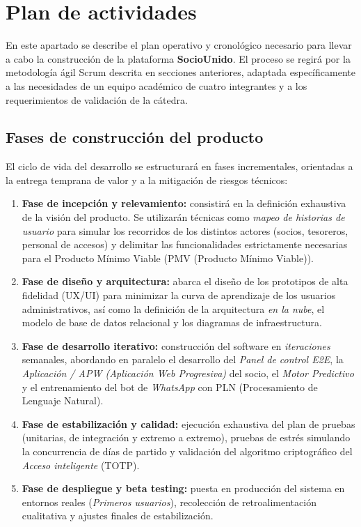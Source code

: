 \section{Plan de actividades}

En este apartado se describe el plan operativo y cronológico necesario para llevar a cabo la construcción de la plataforma \textbf{SocioUnido}. El proceso se regirá por la metodología ágil Scrum descrita en secciones anteriores, adaptada específicamente a las necesidades de un equipo académico de cuatro integrantes y a los requerimientos de validación de la cátedra.

\subsection{Fases de construcción del producto}

El ciclo de vida del desarrollo se estructurará en fases incrementales, orientadas a la entrega temprana de valor y a la mitigación de riesgos técnicos:

\begin{enumerate}
    \item \textbf{Fase de incepción y relevamiento:} consistirá en la definición exhaustiva de la visión del producto. Se utilizarán técnicas como \textit{mapeo de historias de usuario} para simular los recorridos de los distintos actores (socios, tesoreros, personal de accesos) y delimitar las funcionalidades estrictamente necesarias para el Producto Mínimo Viable (PMV (Producto Mínimo Viable)).
    \item \textbf{Fase de diseño y arquitectura:} abarca el diseño de los prototipos de alta fidelidad (UX/UI) para minimizar la curva de aprendizaje de los usuarios administrativos, así como la definición de la arquitectura \textit{en la nube}, el modelo de base de datos relacional y los diagramas de infraestructura.
    \item \textbf{Fase de desarrollo iterativo:} construcción del software en \textit{iteraciones} semanales, abordando en paralelo el desarrollo del \textit{Panel de control E2E}, la \textit{Aplicación / APW (Aplicación Web Progresiva)} del socio, el \textit{Motor Predictivo} y el entrenamiento del bot de \textit{WhatsApp} con PLN (Procesamiento de Lenguaje Natural).
    \item \textbf{Fase de estabilización y calidad:} ejecución exhaustiva del plan de pruebas (unitarias, de integración y extremo a extremo), pruebas de estrés simulando la concurrencia de días de partido y validación del algoritmo criptográfico del \textit{Acceso inteligente} (TOTP).
    \item \textbf{Fase de despliegue y beta testing:} puesta en producción del sistema en entornos reales (\textit{Primeros usuarios}), recolección de retroalimentación cualitativa y ajustes finales de estabilización.
\end{enumerate}

